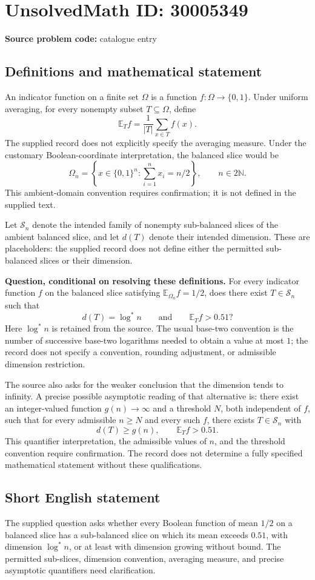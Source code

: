 \documentclass[11pt]{article}
\newcommand{\N}{\mathbb{N}}
\begin{document}
\section*{UnsolvedMath ID: 30005349}
\textbf{Source problem code:} catalogue entry
\subsection{Definitions and mathematical statement}
An indicator function on a finite set \(\Omega\) is a function \(f:\Omega\to\{0,1\}\). Under uniform averaging, for every nonempty subset \(T\subseteq\Omega\), define
\[
\mathbb E_T f=\frac{1}{|T|}\sum_{x\in T}f(x).
\]
The supplied record does not explicitly specify the averaging measure. Under the customary Boolean-coordinate interpretation, the balanced slice would be
\[
\Omega_n=\left\{x\in\{0,1\}^n:\sum_{i=1}^n x_i=n/2\right\},\qquad n\in2\N.
\]
This ambient-domain convention requires confirmation; it is not defined in the supplied text.

Let \(\mathcal S_n\) denote the intended family of nonempty sub-balanced slices of the ambient balanced slice, and let \(d(T)\) denote their intended dimension. These are placeholders: the supplied record does not define either the permitted sub-balanced slices or their dimension.

\textbf{Question, conditional on resolving these definitions.} For every indicator function \(f\) on the balanced slice satisfying \(\mathbb E_{\Omega_n}f=1/2\), does there exist \(T\in\mathcal S_n\) such that
\[
d(T)=\log^*n
\qquad\text{and}\qquad
\mathbb E_Tf>0.51?
\]
Here \(\log^*n\) is retained from the source. The usual base-two convention is the number of successive base-two logarithms needed to obtain a value at most \(1\); the record does not specify a convention, rounding adjustment, or admissible dimension restriction.

The source also asks for the weaker conclusion that the dimension tends to infinity. A precise possible asymptotic reading of that alternative is: there exist an integer-valued function \(g(n)\to\infty\) and a threshold \(N\), both independent of \(f\), such that for every admissible \(n\ge N\) and every such \(f\), there exists \(T\in\mathcal S_n\) with
\[
d(T)\ge g(n),\qquad \mathbb E_Tf>0.51.
\]
This quantifier interpretation, the admissible values of \(n\), and the threshold convention require confirmation. The record does not determine a fully specified mathematical statement without these qualifications.
\subsection{Short English statement}
The supplied question asks whether every Boolean function of mean \(1/2\) on a balanced slice has a sub-balanced slice on which its mean exceeds \(0.51\), with dimension \(\log^*n\), or at least with dimension growing without bound. The permitted sub-slices, dimension convention, averaging measure, and precise asymptotic quantifiers need clarification.
\end{document}

